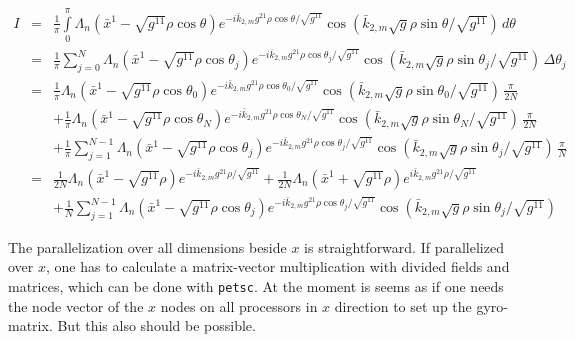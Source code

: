 \begin{eqnarray*}
  I &=&\frac{1}{\pi}\int\limits_0^{\pi} 
  \Lambda_n(\bar x^1-\sqrt{g^{11}} \rho\cos\theta)e^{
    -i\bar k_{2,m}g^{21} \rho\cos\theta/\sqrt{g^{11}}
  }\cos\left(
    \bar k_{2,m}\sqrt{g} \rho\sin\theta/\sqrt{g^{11}}
  \right)\,d\theta\\
  &=& \frac{1}{\pi}\sum\limits_{j=0}^{N} 
  \Lambda_n(\bar x^1-\sqrt{g^{11}} \rho\cos\theta_j) e^{
    -i\bar k_{2,m}g^{21} \rho\cos\theta_j/\sqrt{g^{11}}
  }\cos\left(
    \bar k_{2,m}\sqrt{g} \rho\sin\theta_j/\sqrt{g^{11}}
  \right)\,\Delta\theta_j\\
  &=& \frac{1}{\pi}
  \Lambda_n(\bar x^1-\sqrt{g^{11}} \rho\cos\theta_0) e^{
    -i\bar k_{2,m}g^{21} \rho\cos\theta_0/\sqrt{g^{11}}
  }\cos\left(
    \bar k_{2,m}\sqrt{g} \rho\sin\theta_0/\sqrt{g^{11}}
  \right)\,\frac{\pi}{2N}\\
  &&+ \frac{1}{\pi}
  \Lambda_n(\bar x^1-\sqrt{g^{11}} \rho\cos\theta_N) e^{
    -i\bar k_{2,m}g^{21} \rho\cos\theta_N/\sqrt{g^{11}}
  }\cos\left(
    \bar k_{2,m}\sqrt{g} \rho\sin\theta_N/\sqrt{g^{11}}
  \right)\,\frac{\pi}{2N}\\
  &&+ \frac{1}{\pi}\sum\limits_{j=1}^{N-1} 
  \Lambda_n(\bar x^1-\sqrt{g^{11}} \rho\cos\theta_j) e^{
    -i\bar k_{2,m}g^{21} \rho\cos\theta_j/\sqrt{g^{11}}
  }\cos\left(
    \bar k_{2,m}\sqrt{g} \rho\sin\theta_j/\sqrt{g^{11}}
  \right)\,\frac{\pi}{N}\\
  &=& \frac{1}{2N}
  \Lambda_n(\bar x^1-\sqrt{g^{11}} \rho) e^{
    -i\bar k_{2,m}g^{21} \rho/\sqrt{g^{11}}
  }
  + \frac{1}{2N}
  \Lambda_n(\bar x^1+\sqrt{g^{11}} \rho) e^{
    i\bar k_{2,m}g^{21} \rho/\sqrt{g^{11}}
  }\\
  &&+ \frac{1}{N}\sum\limits_{j=1}^{N-1} 
  \Lambda_n(\bar x^1-\sqrt{g^{11}} \rho\cos\theta_j) e^{
    -i\bar k_{2,m}g^{21} \rho\cos\theta_j/\sqrt{g^{11}}
  }\cos\left(
    \bar k_{2,m}\sqrt{g} \rho\sin\theta_j/\sqrt{g^{11}}
  \right)
\end{eqnarray*}

The parallelization over all dimensions beside $x$ is
straightforward. If parallelized over $x$, one has to calculate a
matrix-vector multiplication with divided fields and matrices, which
can be done with \texttt{petsc}. At the moment is seems as if one
needs the node vector of the $x$ nodes on all processors in $x$
direction to set up the gyro-matrix. But this also should be
possible. 


